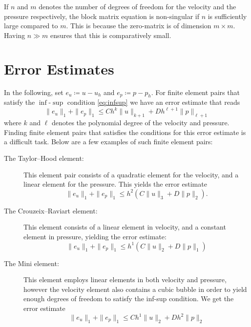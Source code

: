 If \( n \) and \( m \) denotes the number of degrees of freedom for the
velocity and the pressure respectively, the block matrix equation is
non-singular if \( n \) is sufficiently large compared to \( m \). This is
because the zero-matrix is of dimension \( m \times m \). Having \( n \gg m\)
ensures that this is comparatively small. 

\section{Error Estimates}

In the following, set \( e_u \coloneqq u - u_h \) and \( e_p \coloneqq p - p_h
\).  For finite element pairs that satisfy the \( \inf \)-\(\sup\) condition
\cref{eq:infsup} we have an error estimate that reads
\begin{equation}
    \| e_u \|_1 + \| e_p \|_1 \leq C h^k \|u\|_{k+1} + D h^{\ell + 1} \|p\|_{\ell + 1}
\end{equation}
where \( k \) and \( \ell \) denotes the polynomial degree of the velocity and
pressure. Finding finite element pairs that satisfies the conditions for this
error estimate is a difficult task. Below are a few examples of such finite
element pairs:
\begin{description}
    \item[The Taylor--Hood element:]
        This element pair consists of a quadratic element for the velocity, and
        a linear element for the pressure. This yields the error estimate
        \begin{equation}
            \| e_u \|_1 + \| e_p \|_1 \leq h^2 \left( C\|u\|_{3} + D \|p\|_{2}\right).
        \end{equation}
    \item[The Crouzeix--Raviart element:]
        This element consists of a linear element in velocity, and a constant
        element in pressure, yielding the error estimate:
        \begin{equation}
            \| e_u \|_1 + \| e_p \|_1 \leq h^1 \left(C \|u\|_{2} + D \|p\|_{1}\right)
        \end{equation}
    \item[The Mini element:]
        This element employs linear elements in both velocity and pressure,
        however the velocity element also contains a cubic bubble in order to
        yield enough degrees of freedom to satisfy the inf-sup condition. We get the error estimate
        \begin{equation}
            \| e_u \|_1 + \| e_p \|_1 \leq C h^1 \|u\|_{2} + D h^{2} \|p\|_{2}
        \end{equation}
\end{description}

